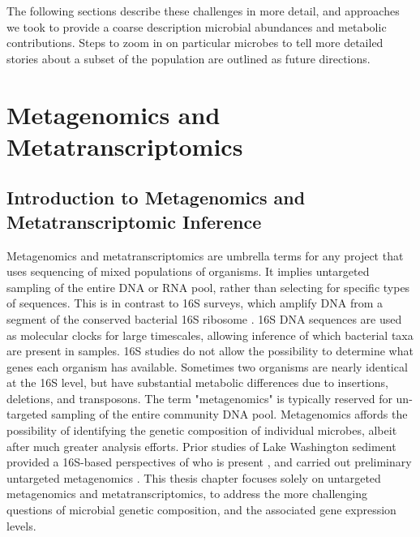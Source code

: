 The following sections describe these challenges in more detail, and approaches we took to provide a coarse description microbial abundances and metabolic contributions.
Steps to zoom in on particular microbes to tell more detailed stories about a subset of the population are outlined as future directions.


\section{Metagenomics and Metatranscriptomics}  %

\subsection{Introduction to Metagenomics and Metatranscriptomic Inference}
Metagenomics and metatranscriptomics are umbrella terms for any project that uses sequencing of mixed populations of organisms.
It implies untargeted sampling of the entire DNA or RNA pool, rather than selecting for specific types of sequences.
This is in contrast to 16S surveys, which amplify DNA from a segment of the conserved bacterial 16S ribosome \cite{kunin2008}.
16S DNA sequences are used as molecular clocks for large timescales, allowing inference of which bacterial taxa are present in samples.
16S studies do not allow the possibility to determine what genes each organism has available.
Sometimes two organisms are nearly identical at the 16S level, but have substantial metabolic differences due to insertions, deletions, and transposons.  %
The term "metagenomics" is typically reserved for un-targeted sampling of the entire community DNA pool.
Metagenomics affords the possibility of identifying the genetic composition of individual microbes, albeit after much greater analysis efforts.
Prior studies of Lake Washington sediment provided a 16S-based perspectives of who is present \cite{beck2013LW, hernandez2015LW, oshkin2015LW}, and carried out preliminary untargeted metagenomics \cite{beck2013LW, oshkin2015LW}.
This thesis chapter focuses solely on untargeted metagenomics and metatranscriptomics, to address the more challenging questions of microbial genetic composition, and the associated gene expression levels. %

